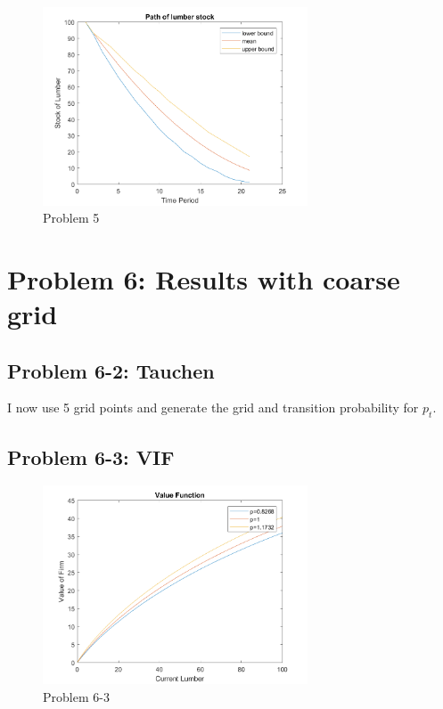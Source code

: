 \documentclass[11pt,letter]{article}
\newcounter{lem}[section] \setcounter{lem}{0}
\begin{document}
\begin{figure}[h]
\begin{center}
\caption{Problem 5}
\includegraphics[width=0.7\textwidth]{prob5_2.png}
\end{center}
\end{figure}


\newpage

\section*{Problem 6: Results with coarse grid}

\subsection*{Problem 6-2: Tauchen}
I now use 5 grid points and generate the grid and transition probability for $p_t$.

\subsection*{Problem 6-3: VIF}
\begin{figure}[h]
\begin{center}
\caption{Problem 6-3}
\includegraphics[width=0.7\textwidth]{prob6_1.png}
\end{center}
\end{figure}
\end{document}

